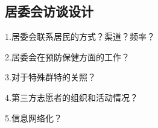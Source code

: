 \subsection{居委会访谈设计}
1.居委会联系居民的方式？渠道？频率？

2.居委会在预防保健方面的工作？

3.对于特殊群特的关照？

4.第三方志愿者的组织和活动情况？

5.信息网络化？
